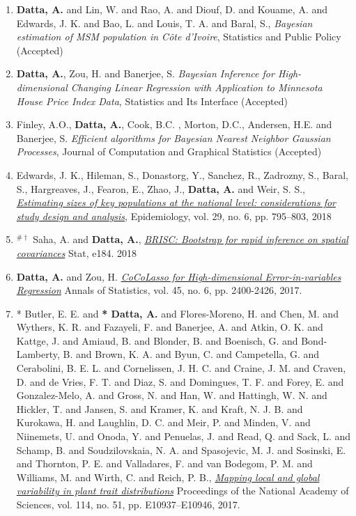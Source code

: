 \documentclass[11pt,a4paper,sans]{moderncv} %
\begin{document}
{\begin{enumerate}
\item \vskip 4mm \textbf{Datta, A.} and Lin, W. and Rao, A. and Diouf, D. and Kouame, A. and Edwards, J. K. and Bao, L. and Louis, T. A. and Baral, S., {\em Bayesian estimation of MSM population in C{\^o}te d'Ivoire}, Statistics and Public Policy (Accepted)
	
\item \vskip 4mm \textbf{Datta, A.}, Zou, H. and Banerjee, S. {\em Bayesian Inference for High-dimensional Changing Linear Regression with Application to Minnesota House Price Index Data}, Statistics and Its Interface (Accepted)
	
\item \vskip 4mm Finley, A.O., \textbf{Datta, A.}, Cook, B.C. ,  Morton, D.C., Andersen, H.E. and Banerjee, S. {\em Efficient algorithms for Bayesian Nearest Neighbor Gaussian Processes}, Journal of Computation and Graphical Statistics (Accepted)	
	
\item \vskip 4mm Edwards, J. K., Hileman, S., Donastorg, Y., Sanchez, R., Zadrozny, S., Baral, S., Hargreaves, J., Fearon, E., Zhao, J., \textbf{Datta, A.} and Weir, S. S.,  {\em \href{https://journals.lww.com/epidem/Fulltext/2018/11000/Estimating_Sizes_of_Key_Populations_at_the.7.aspx}{Estimating sizes of key populations at the national level: considerations for study design and analysis}}, Epidemiology, vol. 29,  no. 6, pp. 795--803, 2018

\item \vskip 4mm $^{\# \dagger}$ Saha, A. and \textbf{Datta, A.}, \href{https://onlinelibrary.wiley.com/doi/abs/10.1002/sta4.184}{\em BRISC: Bootstrap for rapid inference on spatial covariances} Stat, e184. 2018

\item \vskip 4mm \textbf{Datta, A.} and Zou, H. \href{https://projecteuclid.org/euclid.aos/1513328577}{\em CoCoLasso for High-dimensional Error-in-variables Regression} Annals of Statistics, vol. 45, no. 6, pp. 2400-2426, 2017.

\item \vskip 4mm * Butler, E. E. and \textbf{* Datta, A.} and Flores-Moreno, H. and Chen, M. and Wythers, K. R. and Fazayeli, F. and Banerjee, A. and Atkin, O. K. and Kattge, J. and Amiaud, B. and Blonder, B. and Boenisch, G. and Bond-Lamberty, B. and Brown, K. A. and Byun, C. and Campetella, G. and Cerabolini, B. E. L. and Cornelissen, J. H. C. and Craine, J. M. and Craven, D. and de Vries, F. T. and Diaz, S. and Domingues, T. F. and Forey, E. and Gonzalez-Melo, A. and Gross, N. and Han, W. and Hattingh, W. N. and Hickler, T. and Jansen, S. and Kramer, K. and Kraft, N. J. B. and Kurokawa, H. and Laughlin, D. C. and Meir, P. and Minden, V. and Niinemets, U. and Onoda, Y. and Penuelas, J. and Read, Q. and Sack, L. and Schamp, B. and Soudzilovskaia, N. A. and Spasojevic, M. J. and Sosinski, E. and Thornton, P. E. and Valladares, F. and van Bodegom, P. M. and Williams, M. and Wirth, C. and Reich, P. B.,  \href{http://www.pnas.org/content/114/51/E10937}{\em Mapping local and global variability in plant trait distributions} Proceedings of the National Academy of Sciences, vol. 114, no. 51, pp. E10937--E10946, 2017.


\end{enumerate}}
\end{document}
